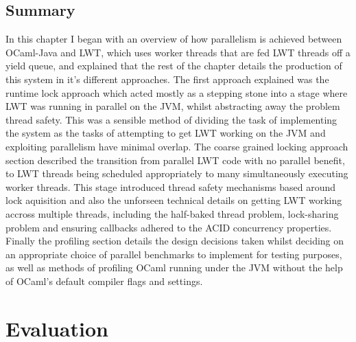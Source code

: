 \documentclass[12pt,twoside,notitlepage]{report}
\begin{document}
\section{Summary}
\label{sec:implementation_summary}
In this chapter I began with an overview of how parallelism is achieved between OCaml-Java and LWT, which uses worker threads that are fed LWT threads off a yield queue, and explained that the rest of the chapter details the
production of this system in it's different approaches. The first approach explained was the runtime lock approach which acted mostly as a stepping stone into a stage where LWT was running in parallel on the JVM, whilst abstracting
away the problem thread safety. This was a sensible method of dividing the task of implementing the system as the tasks of attempting to get LWT working on the JVM and exploiting parallelism have minimal overlap. The coarse grained
locking approach section described the transition from parallel LWT code with no parallel benefit, to LWT threads being scheduled appropriately to many simultaneously executing worker threads. This stage introduced thread safety
mechanisms based around lock aquisition and also the unforseen technical details on getting LWT working accross multiple threads, including the half-baked thread problem, lock-sharing problem and ensuring callbacks adhered to the ACID
concurrency properties. Finally the profiling section details the design decisions taken whilst deciding on an appropriate choice of parallel benchmarks to implement for testing purposes, as well as methods of profiling OCaml running
under the JVM without the help of OCaml's default compiler flags and settings.

\chapter{Evaluation}
\label{chap:evaluation}
\end{document}
